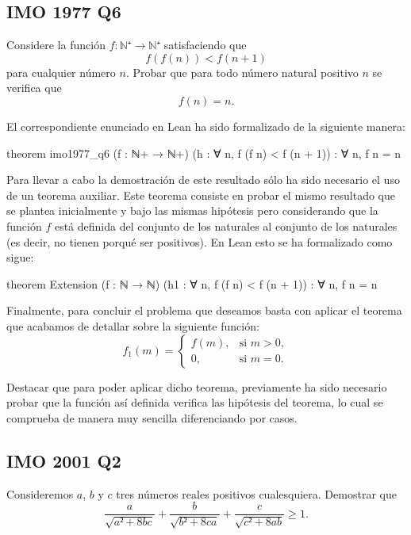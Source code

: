 \subsection*{IMO 1977 Q6}

\noindent
Considere la función
\(f:ℕ⁺ → ℕ⁺\) satisfaciendo que
\[f(f(n)) < f(n+1)\]
para cualquier número \(n\). Probar que para todo número
natural positivo \(n\) se verifica que
\[f(n) = n.\]

El correspondiente enunciado en Lean ha sido formalizado de la siguiente
manera:
\begin{leancode}
theorem imo1977_q6
  (f : ℕ+ → ℕ+)
  (h : ∀ n, f (f n) < f (n + 1))
  : ∀ n, f n = n
\end{leancode}

Para llevar a cabo la demostración de este resultado sólo ha sido
necesario el uso de un teorema auxiliar. Este teorema consiste en probar
el mismo resultado que se plantea inicialmente y bajo las mismas
hipótesis pero considerando que la función \(f\) está definida del
conjunto de los naturales al conjunto de los naturales (es decir, no
tienen porqué ser positivos). En Lean esto se ha formalizado como sigue:
\begin{leancode}
theorem Extension
  (f : ℕ → ℕ)
  (h1 : ∀ n, f (f n) < f (n + 1))
  : ∀ n, f n = n
\end{leancode}

Finalmente, para concluir el problema que deseamos basta con aplicar el
teorema que acabamos de detallar sobre la siguiente función:
 \begin{equation}
    f_1(m)=\left\lbrace\begin{array}{ll}
                         f(m), & \text{si } m>0, \\
                         0, & \text{si } m=0.
                       \end{array}\right.
\end{equation}

Destacar que para poder aplicar dicho teorema, previamente ha sido
necesario probar que la función así definida verifica las hipótesis del
teorema, lo cual se comprueba de manera muy sencilla diferenciando por
casos.

\subsection*{IMO 2001 Q2}

\noindent
Consideremos \(a\), \(b\) y \(c\) tres números reales positivos
cualesquiera. Demostrar que
\begin{equation}\label{iintroq2}
  \frac{a}{\sqrt{a²+8bc}} +
  \frac{b}{\sqrt{b²+8ca}} +
  \frac{c}{\sqrt{c²+8ab}} ≥ 1.
\end{equation}

